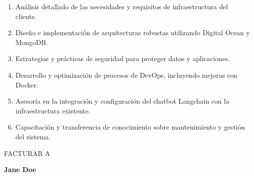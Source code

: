 \documentclass{letter}
\begin{document}
\begin{enumerate}
  \item Análisis detallado de las necesidades y requisitos de infraestructura del cliente.
  \item Diseño e implementación de arquitecturas robustas utilizando Digital Ocean y MongoDB.
  \item Estrategias y prácticas de seguridad para proteger datos y aplicaciones.
  \item Desarrollo y optimización de procesos de DevOps, incluyendo mejoras con Docker.
  \item Asesoría en la integración y configuración del chatbot Langchain con la infraestructura existente.
  \item Capacitación y transferencia de conocimiento sobre mantenimiento y gestión del sistema.
\end{enumerate}

FACTURAR A

\Large\textbf{Jane Doe}\normalsize
\end{document}

